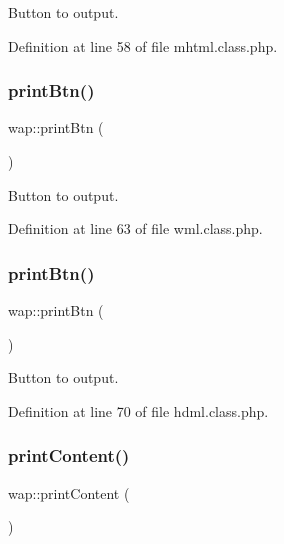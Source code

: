Button to output. 



Definition at line 58 of file mhtml.\+class.\+php.

\hypertarget{classwap_a47437aad53e77ce53aebb4db6240cc38}{}\label{classwap_a47437aad53e77ce53aebb4db6240cc38} 
\subsubsection{\texorpdfstring{print\+Btn()}{printBtn()}\hspace{0.1cm}{\footnotesize\ttfamily [2/3]}}
{\footnotesize\ttfamily wap\+::print\+Btn (\begin{DoxyParamCaption}{ }\end{DoxyParamCaption})}



Button to output. 



Definition at line 63 of file wml.\+class.\+php.

\hypertarget{classwap_a47437aad53e77ce53aebb4db6240cc38}{}\label{classwap_a47437aad53e77ce53aebb4db6240cc38} 
\subsubsection{\texorpdfstring{print\+Btn()}{printBtn()}\hspace{0.1cm}{\footnotesize\ttfamily [3/3]}}
{\footnotesize\ttfamily wap\+::print\+Btn (\begin{DoxyParamCaption}{ }\end{DoxyParamCaption})}



Button to output. 



Definition at line 70 of file hdml.\+class.\+php.

\hypertarget{classwap_a1edebe2b6a90ec08ab149ad2b2866dbd}{}\label{classwap_a1edebe2b6a90ec08ab149ad2b2866dbd} 
\subsubsection{\texorpdfstring{print\+Content()}{printContent()}\hspace{0.1cm}{\footnotesize\ttfamily [1/3]}}
{\footnotesize\ttfamily wap\+::print\+Content (\begin{DoxyParamCaption}{ }\end{DoxyParamCaption})}



